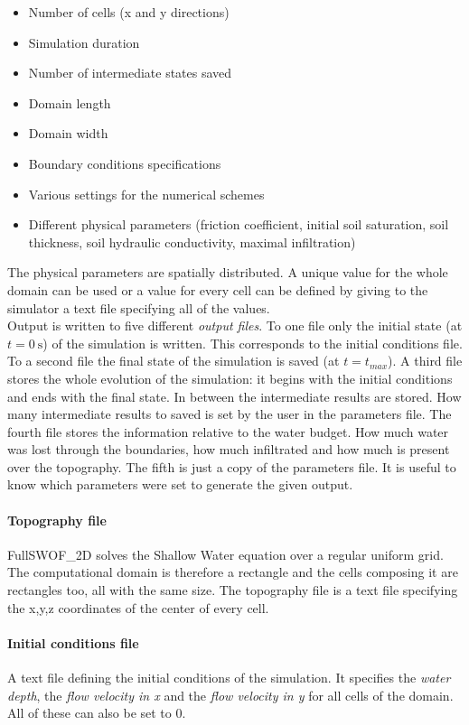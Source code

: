 \begin{itemize}
\itemsep0em
  \item Number of cells (x and y directions)
  \item Simulation duration
  \item Number of intermediate states saved
  \item Domain length
  \item Domain width
  \item Boundary conditions specifications
  \item Various settings for the numerical schemes
  \item Different physical parameters (friction coefficient, initial soil saturation, soil thickness, soil hydraulic conductivity, maximal infiltration)
\end{itemize}

The physical parameters are spatially distributed. A unique value for the whole domain can be used or a value for every cell can be defined by giving to the simulator a text file specifying all of the values.\\

Output is written to five different \emph{output files}.
To one file only the initial state (at $t = \SI{0}{\s}$) of the simulation is written.
This corresponds to the initial conditions file.
To a second file the final state of the simulation is saved (at $t = t_{max}$).
A third file stores the whole evolution of the simulation: it begins with the initial conditions and ends with the final state.
In between the intermediate results are stored.
How many intermediate results to saved is set by the user in the parameters file.
The fourth file stores the information relative to the water budget.
How much water was lost through the boundaries, how much infiltrated and how much is present over the topography.
The fifth is just a copy of the parameters file.
It is useful to know which parameters were set to generate the given output.

\paragraph{Topography file} FullSWOF\_2D solves the Shallow Water equation over a regular uniform grid. The computational domain is therefore a rectangle and the cells composing it are rectangles too, all with the same size. The topography file is a text file specifying the x,y,z coordinates of the center of every cell.

\paragraph{Initial conditions file} A text file defining the initial conditions of the simulation. It specifies the \emph{water depth}, the \emph{flow velocity in x} and the \emph{flow velocity in y} for all cells of the domain. All of these can also be set to \num{0}.\\

